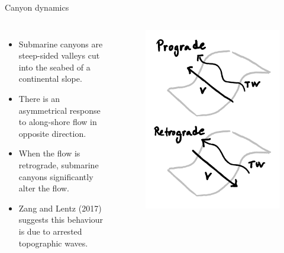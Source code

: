 \documentclass{beamer}
\begin{document}
\begin{frame}{Canyon dynamics}
\begin{columns}
\begin{itemize}
    \item Submarine canyons are steep-sided valleys cut into the seabed of a continental slope.
    \item There is an asymmetrical response to along-shore flow in opposite direction. 
    \item When the flow is retrograde, submarine canyons significantly alter the flow.
    \item Zang and Lentz (2017) suggests this behaviour is due to arrested topographic waves.
\end{itemize}
\begin{figure}
    \centering
    \includegraphics[width=\linewidth]{figures/prograde_retrograde_sketch.pdf}
\end{figure}
\end{columns}
\end{frame}
\end{document}
